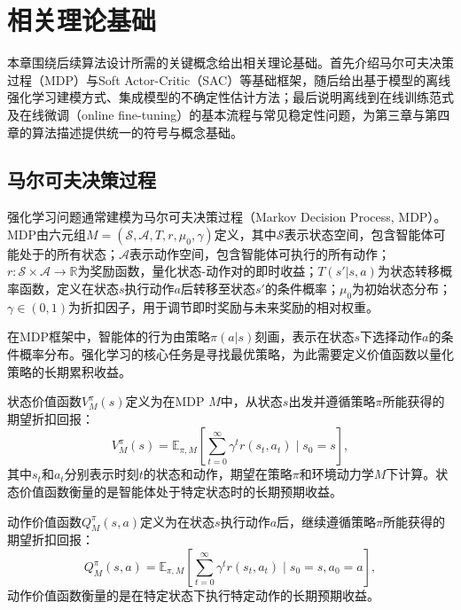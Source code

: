 \chapter{相关理论基础}\label{Chap:chap2}

本章围绕后续算法设计所需的关键概念给出相关理论基础。首先介绍马尔可夫决策过程（MDP）与Soft Actor-Critic（SAC）等基础框架，随后给出基于模型的离线强化学习建模方式、集成模型的不确定性估计方法；最后说明离线到在线训练范式及在线微调（online fine-tuning）的基本流程与常见稳定性问题，为第三章与第四章的算法描述提供统一的符号与概念基础。


\section{马尔可夫决策过程}\label{Sec2.1}

强化学习问题通常建模为马尔可夫决策过程（Markov Decision Process, MDP）\cite{Sutton2018RLBook}。MDP由六元组$M = (\mathcal{S}, \mathcal{A}, T, r, \mu_0, \gamma)$定义，其中$\mathcal{S}$表示状态空间，包含智能体可能处于的所有状态；$\mathcal{A}$表示动作空间，包含智能体可执行的所有动作；$r: \mathcal{S} \times \mathcal{A} \rightarrow \mathbb{R}$为奖励函数，量化状态-动作对的即时收益；$T(s'|s,a)$为状态转移概率函数，定义在状态$s$执行动作$a$后转移至状态$s'$的条件概率；$\mu_0$为初始状态分布；$\gamma \in (0,1)$为折扣因子，用于调节即时奖励与未来奖励的相对权重。

在MDP框架中，智能体的行为由策略$\pi(a|s)$刻画，表示在状态$s$下选择动作$a$的条件概率分布。强化学习的核心任务是寻找最优策略，为此需要定义价值函数以量化策略的长期累积收益。

状态价值函数$V_M^\pi(s)$定义为在MDP $M$中，从状态$s$出发并遵循策略$\pi$所能获得的期望折扣回报：
\begin{equation}\label{Eq:Chap2_value_function}
  V_M^\pi(s) = \mathbb{E}_{\pi, M}\left[\sum_{t=0}^{\infty} \gamma^t r(s_t, a_t) \mid s_0 = s\right],
\end{equation}
其中$s_t$和$a_t$分别表示时刻$t$的状态和动作，期望在策略$\pi$和环境动力学$M$下计算。状态价值函数衡量的是智能体处于特定状态时的长期预期收益。

动作价值函数$Q_M^\pi(s,a)$定义为在状态$s$执行动作$a$后，继续遵循策略$\pi$所能获得的期望折扣回报：
\begin{equation}\label{Eq:Chap2_q_function}
  Q_M^\pi(s,a) = \mathbb{E}_{\pi, M}\left[\sum_{t=0}^{\infty} \gamma^t r(s_t, a_t) \mid s_0 = s, a_0 = a\right],
\end{equation}
动作价值函数衡量的是在特定状态下执行特定动作的长期预期收益。

